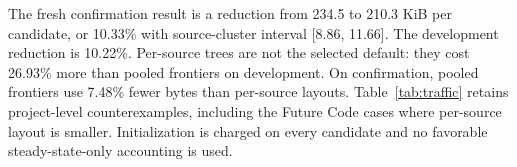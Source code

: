 The fresh confirmation result is a reduction from 234.5 to 210.3 KiB per candidate, or 10.33\% with source-cluster interval [8.86, 11.66]. The development reduction is 10.22\%. Per-source trees are not the selected default: they cost 26.93\% more than pooled frontiers on development. On confirmation, pooled frontiers use 7.48\% fewer bytes than per-source layouts. Table~\ref{tab:traffic} retains project-level counterexamples, including the Future Code cases where per-source layout is smaller. Initialization is charged on every candidate and no favorable steady-state-only accounting is used.
